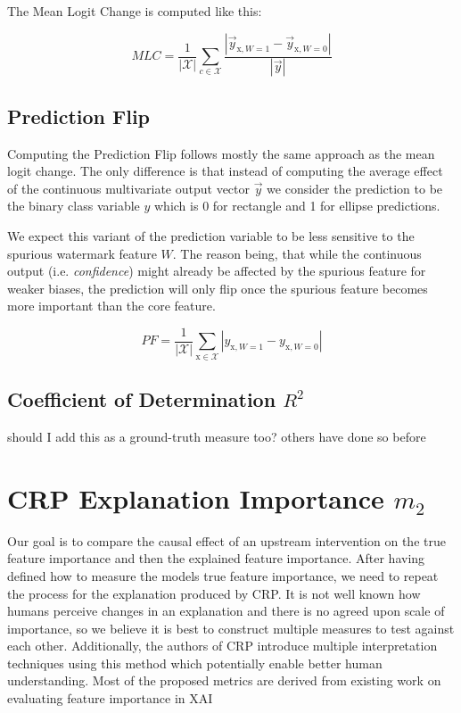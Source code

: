 The Mean Logit Change is computed like this:

\begin{equation}
\displaystyle 
MLC =\frac{1}{|\mathcal{X}|} \sum_{c \in \mathcal{X}} \frac{|\vec{y}_{\mathrm{x}, W=1}- \vec{y}_{\mathrm{x}, W=0} |}{|\vec{y}|}
\end{equation}

\subsection{Prediction Flip}
Computing the Prediction Flip follows mostly the same approach as the mean logit change. The only difference is that instead of computing the average effect of the continuous multivariate output vector $\vec{y}$ we consider the prediction to be the binary class variable $y$ which is 0 for rectangle and 1 for ellipse predictions. 

We expect this variant of the prediction variable to be less sensitive to the spurious watermark feature $W$. The reason being, that while the continuous output (i.e. \textit{confidence}) might already be affected by the spurious feature for weaker biases, the prediction will only flip once the spurious feature becomes more important than the core feature. 

\begin{equation}
\displaystyle 
PF =\frac{1}{|\mathcal{X}|} \sum_{\mathrm{x} \in \mathcal{X}} |y_{\mathrm{x}, W=1} - y_{\mathrm{x}, W=0} |
\end{equation}

\subsection{Coefficient of Determination $R^2$}
should I add this as a ground-truth measure too? others have done so before

\section{CRP Explanation Importance $m_2$}\label{section:measure}
Our goal is to compare the causal effect of an upstream intervention on the true feature importance and then the explained feature importance. After having defined how to measure the models true feature importance, we need to repeat the process for the explanation produced by CRP. It is not well known how humans perceive changes in an explanation and there is no agreed upon scale of importance, so we believe it is best to construct multiple measures to test against each other. {\color{gray} Additionally, the authors of CRP introduce multiple interpretation techniques using this method which potentially enable better human understanding. }Most of the proposed metrics are derived from existing work on evaluating feature importance in XAI \cite{Arras2022} \\

